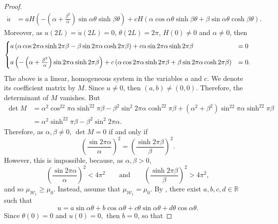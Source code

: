 \documentclass[11pt]{amsart}
\renewcommand{\geq}{\geqslant}
\newcommand{\rr}{{\mathbb{R}}}
\theoremstyle{definition}
\theoremstyle{remark}
\numberwithin{equation}{section}
\begin{document}
\begin{proof}
\begin{align*}
\dot u&=aH\left(-\left(\alpha+\frac{\beta^2}{\alpha}\right)\sin\alpha\theta\sinh\beta\theta\right)+cH\left(\alpha\cos\alpha\theta\sinh\beta\theta+\beta\sin\alpha\theta\cosh\beta\theta\right).
\end{align*}
Moreover, as $u(2L)=\dot u(2L)=0$, $\theta(2L)=2\pi$, $H(0)\neq 0$ and $\alpha\neq 0$, then 
\begin{equation*}
\begin{cases}
a\left(\alpha\cos 2\pi\alpha\sinh2\pi\beta-\beta\sin 2\pi\alpha\cosh2\pi\beta\right)+c\alpha \sin 2\pi\alpha\sinh 2\pi\beta&=0\vspace{0.3cm}\\ 
a\left(-\left(\alpha+\frac{\beta^2}{\alpha}\right)\sin 2\pi\alpha\sinh 2\pi\beta\right)+c\left(\alpha\cos 2\pi\alpha\sinh 2\pi\beta+\beta\sin2\pi\alpha\cosh 2\pi\beta\right)&=0.
\end{cases}
\end{equation*}
The above is a linear, homogeneous system in the variables $a$ and $c$. We denote its coefficient matrix by $M$. Since $u\neq0$, then $(a,b)\neq(0,0)$. Therefore, the determinant of $M$ vanishes. But 
\begin{equation*}
\begin{split}
\det M&=\alpha^2\cos^22\pi\alpha\sinh^22\pi\beta-\beta^2\sin^2 2\pi\alpha\cosh^22\pi\beta+\left(\alpha^2+\beta^2\right)\sin^22\pi\alpha\sinh^22\pi\beta\\
&=\alpha^2\sinh^22\pi\beta-\beta^2\sin^2 2\pi\alpha.
\end{split}
\end{equation*}
Therefore, as $\alpha,\beta\neq 0$, $\det M=0$ if and only if
\begin{equation*}
\left(\frac{\sin 2\pi\alpha}{\alpha}\right)^2=\left(\frac{\sinh 2\pi\beta}{\beta}\right)^2.
\end{equation*}
However, this is impossible, because, as $\alpha,\beta>0$,
\begin{equation*}
\left(\frac{\sin 2\pi\alpha}{\alpha}\right)^2<4\pi^2\qquad\text{and}\qquad \left(\frac{\sinh 2\pi\beta}{\beta}\right)^2>4\pi^2,
\end{equation*}
and so $\mu_{\mathcal W_1}\geq\mu_0$.
Instead, assume that  $\mu_{\mathcal W_1}=\mu_0$.  By , there exist $a,b,c,d\in\rr$ such that 
\begin{equation*}
u=a\sin \alpha\theta+b\cos \alpha\theta+c\theta \sin \alpha\theta+d\theta\cos \alpha\theta.
\end{equation*}
Since $\theta(0)=0$ and $u(0)=0,$ then $b=0$, so that

\end{proof}
\end{document}
